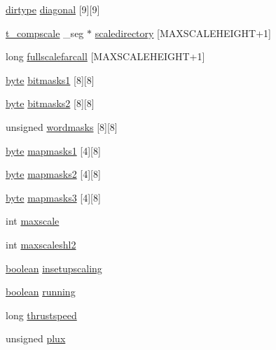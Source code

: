 \begin{DoxyCompactItemize}
\item 
\hyperlink{WL__DEF_8H_a04ddebf7fd2f3611173b2d219f4ec05f}{dirtype} \hyperlink{WL__DEF_8H_a10ebed132303227c107c0a505ebc4681}{diagonal} \mbox{[}9\mbox{]}\mbox{[}9\mbox{]}
\item 
\hyperlink{structt__compscale}{t\_\-compscale} \_\-seg $\ast$ \hyperlink{WL__DEF_8H_a79aa20f0658411ee8fe8706f15753026}{scaledirectory} \mbox{[}MAXSCALEHEIGHT+1\mbox{]}
\item 
long \hyperlink{WL__DEF_8H_a4b3db832e1c51c7a13e5e973de3115b3}{fullscalefarcall} \mbox{[}MAXSCALEHEIGHT+1\mbox{]}
\item 
\hyperlink{ID__HEAD_8H_a0c8186d9b9b7880309c27230bbb5e69d}{byte} \hyperlink{WL__DEF_8H_a145408d8da904826bbdf39ee21a933df}{bitmasks1} \mbox{[}8\mbox{]}\mbox{[}8\mbox{]}
\item 
\hyperlink{ID__HEAD_8H_a0c8186d9b9b7880309c27230bbb5e69d}{byte} \hyperlink{WL__DEF_8H_a2e4bc19e2fe7255ee2a3887a9b07404e}{bitmasks2} \mbox{[}8\mbox{]}\mbox{[}8\mbox{]}
\item 
unsigned \hyperlink{WL__DEF_8H_a1c8053b1c5185cc1701015d26ca61eb0}{wordmasks} \mbox{[}8\mbox{]}\mbox{[}8\mbox{]}
\item 
\hyperlink{ID__HEAD_8H_a0c8186d9b9b7880309c27230bbb5e69d}{byte} \hyperlink{WL__DEF_8H_ac94f1a50e42c5f020505d6c1b77c4f5e}{mapmasks1} \mbox{[}4\mbox{]}\mbox{[}8\mbox{]}
\item 
\hyperlink{ID__HEAD_8H_a0c8186d9b9b7880309c27230bbb5e69d}{byte} \hyperlink{WL__DEF_8H_a41f7ecdc70d7ae35ee9d6594f950d37c}{mapmasks2} \mbox{[}4\mbox{]}\mbox{[}8\mbox{]}
\item 
\hyperlink{ID__HEAD_8H_a0c8186d9b9b7880309c27230bbb5e69d}{byte} \hyperlink{WL__DEF_8H_ab39851371b2e506e131e50d79d8550d8}{mapmasks3} \mbox{[}4\mbox{]}\mbox{[}8\mbox{]}
\item 
int \hyperlink{WL__DEF_8H_a4531e3adda9a00231c5fc8b7a4644398}{maxscale}
\item 
int \hyperlink{WL__DEF_8H_ac10b61c2a588ba00d9ecda54429e0a9d}{maxscaleshl2}
\item 
\hyperlink{ID__HEAD_8H_a7c6368b321bd9acd0149b030bb8275ed}{boolean} \hyperlink{WL__DEF_8H_a8fb7a0719ca4fe8c02ecd0895589c0be}{insetupscaling}
\item 
\hyperlink{ID__HEAD_8H_a7c6368b321bd9acd0149b030bb8275ed}{boolean} \hyperlink{WL__DEF_8H_a2bb58b88ac256b165a95a806ae3b41e5}{running}
\item 
long \hyperlink{WL__DEF_8H_ac9683e4ab6c67081743f542dc09a74c0}{thrustspeed}
\item 
unsigned \hyperlink{WL__DEF_8H_a098f3c7a6e9b99f0d4d5fbb552b46754}{plux}

\end{DoxyCompactItemize}
